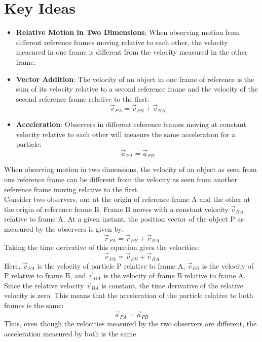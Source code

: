 \documentclass{article}
\begin{document}
\section*{Key Ideas}
\begin{itemize}
    \item \textbf{Relative Motion in Two Dimensions}: When observing motion from different reference frames moving relative to each other, the velocity measured in one frame is different from the velocity measured in the other frame.
    \item \textbf{Vector Addition}: The velocity of an object in one frame of reference is the sum of its velocity relative to a second reference frame and the velocity of the second reference frame relative to the first:
    \[
    \vec{v}_{PA} = \vec{v}_{PB} + \vec{v}_{BA}
    \]
    \item \textbf{Acceleration}: Observers in different reference frames moving at constant velocity relative to each other will measure the same acceleration for a particle:
    \[
    \vec{a}_{PA} = \vec{a}_{PB}
    \]
\end{itemize}
When observing motion in two dimensions, the velocity of an object as seen from one reference frame can be different from the velocity as seen from another reference frame moving relative to the first.\vspace{12pt}\\
Consider two observers, one at the origin of reference frame A and the other at the origin of reference frame B. Frame B moves with a constant velocity $\vec{v}_{BA}$ relative to frame A. At a given instant, the position vector of the object P as measured by the observers is given by:
\[
\vec{r}_{PA} = \vec{r}_{PB} + \vec{r}_{BA}
\]
Taking the time derivative of this equation gives the velocities:
\[
\vec{v}_{PA} = \vec{v}_{PB} + \vec{v}_{BA}
\]
Here, $\vec{v}_{PA}$ is the velocity of particle P relative to frame A, $\vec{v}_{PB}$ is the velocity of P relative to frame B, and $\vec{v}_{BA}$ is the velocity of frame B relative to frame A.\vspace{12pt}\\
Since the relative velocity $\vec{v}_{BA}$ is constant, the time derivative of the relative velocity is zero. This means that the acceleration of the particle relative to both frames is the same:
\[
\vec{a}_{PA} = \vec{a}_{PB}
\]
Thus, even though the velocities measured by the two observers are different, the acceleration measured by both is the same.
\end{document}
